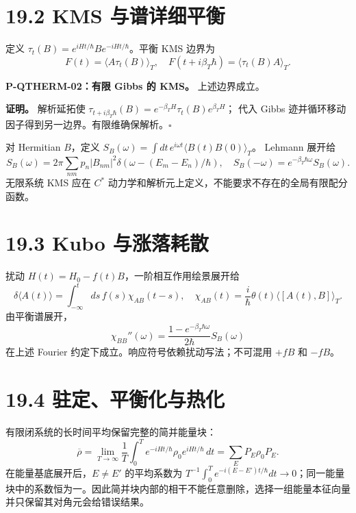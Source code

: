 \documentclass[
  11pt,
  oneside]{book}
\begin{document}
\hypertarget{kms-ux4e0eux8c31ux8be6ux7ec6ux5e73ux8861}{%
\section{19.2 KMS
与谱详细平衡}\label{kms-ux4e0eux8c31ux8be6ux7ec6ux5e73ux8861}}

定义 \(\tau_t(B)=e^{iHt/\hbar}Be^{-iHt/\hbar}\)。平衡 KMS 边界为 \[
F(t)=\langle A\tau_t(B)\rangle_T,\quad
F(t+i\beta_T\hbar)=\langle\tau_t(B)A\rangle_T.
\]

\protect\hypertarget{p-qtherm-02}{}{}

\textbf{P-QTHERM-02：有限 Gibbs 的 KMS。} 上述边界成立。

\textbf{证明。} 解析延拓使
\(\tau_{t+i\beta_T\hbar}(B)= e^{-\beta_TH}\tau_t(B)e^{\beta_TH}\)； 代入
Gibbs 迹并循环移动因子得到另一边界。有限维确保解析。\(\square\)

对 Hermitian \(B\)，定义
\(S_B(\omega)=\int dt\,e^{i\omega t}\langle B(t)B(0)\rangle_T\)。
Lehmann 展开给 \[
S_B(\omega)=2\pi\sum_{nm}p_n|B_{nm}|^2
\delta(\omega-(E_m-E_n)/\hbar),
\quad S_B(-\omega)=e^{-\beta_T\hbar\omega}S_B(\omega).
\] 无限系统 KMS 应在 \(C^*\)
动力学和解析元上定义，不能要求不存在的全局有限配分函数。

\hypertarget{kubo-ux4e0eux6da8ux843dux8017ux6563}{%
\section{19.3 Kubo
与涨落耗散}\label{kubo-ux4e0eux6da8ux843dux8017ux6563}}

扰动 \(H(t)=H_0-f(t)B\)，一阶相互作用绘景展开给 \[
\delta\langle A(t)\rangle=
\int_{-\infty}^tds\,f(s)\chi_{AB}(t-s),\quad
\chi_{AB}(t)=\frac{i}{\hbar}\theta(t)\langle[A(t),B]\rangle_T.
\] 由平衡谱展开， \[
\chi_{BB}''(\omega)
=\frac{1-e^{-\beta_T\hbar\omega}}{2\hbar}S_B(\omega)
\] 在上述 Fourier 约定下成立。响应符号依赖扰动写法；不可混用 \(+fB\) 和
\(-fB\)。

\hypertarget{ux9a7bux5b9aux5e73ux8861ux5316ux4e0eux70edux5316}{%
\section{19.4
驻定、平衡化与热化}\label{ux9a7bux5b9aux5e73ux8861ux5316ux4e0eux70edux5316}}

有限闭系统的长时间平均保留完整的简并能量块： \[
\overline\rho=\lim_{T\to\infty}\frac1T\int_0^T
 e^{-iHt/\hbar}\rho_0e^{iHt/\hbar}\,dt
=\sum_E P_E\rho_0P_E.
\] 在能量基底展开后，\(E\ne E'\) 的平均系数为
\(T^{-1}\int_0^T e^{-i(E-E')t/\hbar}dt\to0\)；同一能量块中的系数恒为一。因此简并块内部的相干不能任意删除，选择一组能量本征向量并只保留其对角元会给错误结果。
\end{document}
